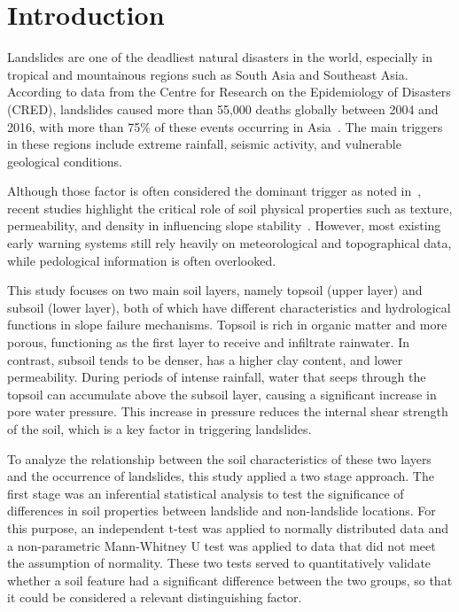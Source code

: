 \section{Introduction}

Landslides are one of the deadliest natural disasters in the world, especially in tropical and mountainous regions such as South Asia and Southeast Asia. According to data from the Centre for Research on the Epidemiology of Disasters (CRED), landslides caused more than 55,000 deaths globally between 2004 and 2016, with more than 75\% of these events occurring in Asia~\cite{intro01}. 
The main triggers in these regions include extreme rainfall, seismic activity, and vulnerable geological conditions. 

Although those factor is often considered the dominant trigger as noted in~\cite{intro02}, recent studies highlight the critical role of soil physical properties such as texture, permeability, and density in influencing slope stability~\cite{intro03}. 
However, most existing early warning systems still rely heavily on meteorological and topographical data, while pedological information is often overlooked.

This study focuses on two main soil layers, namely topsoil (upper layer) and subsoil (lower layer), both of which have different characteristics and hydrological functions in slope failure mechanisms. Topsoil is rich in organic matter and more porous, functioning as the first layer to receive and infiltrate rainwater. In contrast, subsoil tends to be denser, has a higher clay content, and lower permeability. 
During periods of intense rainfall, water that seeps through the topsoil can accumulate above the subsoil layer, causing a significant increase in pore water pressure. This increase in pressure reduces the internal shear strength of the soil, which is a key factor in triggering landslides.

To analyze the relationship between the soil characteristics of these two layers and the occurrence of landslides, this study applied a two stage approach. The first stage was an inferential statistical analysis to test the significance of differences in soil properties between landslide and non-landslide locations. 
For this purpose, an independent t-test was applied to normally distributed data and a non-parametric Mann-Whitney U test was applied to data that did not meet the assumption of normality. These two tests served to quantitatively validate whether a soil feature had a significant difference between the two groups, so that it could be considered a relevant distinguishing factor. 

